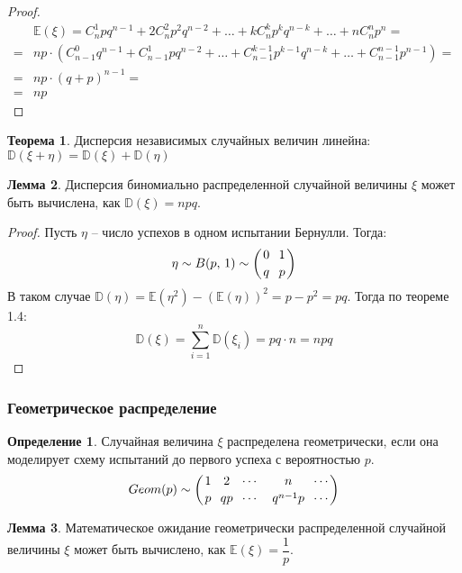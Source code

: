 \documentclass[12pt]{article}
\theoremstyle{definition}
\newtheorem{theorem}{Теорема}[section]
\newtheorem{lemma}[theorem]{Лемма}
\newtheorem{definition}{Определение}
\newcommand{\E}{\mathbb{E}}
\newcommand{\D}{\mathbb{D}}
\begin{document}
\begin{proof}
    \begin{align*}
        &\E(\xi) = C_n^1pq^{n-1} + 2C_n^2p^2q^{n-2} + \ldots + kC_n^kp^kq^{n-k} + \ldots + nC_n^np^n = \\
        =& np \cdot (C_{n-1}^0q^{n-1} + C_{n-1}^1pq^{n-2}+\ldots + C_{n-1}^{k-1}p^{k-1}q^{n-k} + \ldots + C_{n-1}^{n-1}p^{n-1})=\\
        =& np \cdot (q+p)^{n-1}=\\
        =& np
    \end{align*}
\end{proof}

\begin{theorem}
    Дисперсия независимых случайных величин линейна: $\D(\xi+\eta)=\D(\xi)+\D(\eta)$
\end{theorem}

\begin{lemma}
    Дисперсия биномиально распределенной случайной величины $\xi$ может быть вычислена, как $\D(\xi)=npq$.
\end{lemma}

\begin{proof}
    Пусть $\eta$ -- число успехов в одном испытании Бернулли. Тогда:
    $$\eta \sim B(p,\,1) \sim \left(\genfrac{}{}{0pt}{0}{0}{q} \,\,\, \genfrac{}{}{0pt}{0}{1}{p}\right)$$
    В таком случае $\D(\eta)=\E(\eta^2)-(\E(\eta))^2=p-p^2=pq$. Тогда по теореме 1.4:
    $$\D(\xi)=\sum_{i=1}^{n}\D(\xi_i)=pq \cdot n = npq$$
\end{proof}

\subsubsection{Геометрическое распределение}

\begin{definition}
    Случайная величина $\xi$ распределена геометрически, если она моделирует схему испытаний до первого успеха с вероятностью $p$.
    $$Geom(p) \sim \left( \genfrac{}{}{0pt}{0}{1}{p} \,\,\, \genfrac{}{}{0pt}{0}{2}{qp} \,\,\, \genfrac{}{}{0pt}{0}{\cdots}{\cdots} \,\,\, \,\,\, \genfrac{}{}{0pt}{0}{n}{q^{n-1}p} \,\,\, \genfrac{}{}{0pt}{0}{\cdots}{\cdots}\right)$$
\end{definition}

\begin{lemma}
    Математическое ожидание геометрически распределенной случайной величины $\xi$ может быть вычислено, как $\E(\xi)=\dfrac{1}{p}$.
\end{lemma}
\end{document}
